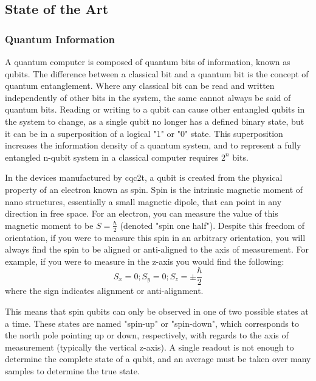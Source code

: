 \label{sec::theory}
\subsection{State of the Art}
\subsubsection{Quantum Information}
	A quantum computer is composed of quantum bits of information, known as qubits. The difference between a classical bit and a quantum bit is the concept of quantum entanglement. Where any classical bit can be read and written independently of other bits in the system, the same cannot always be said of quantum bits. Reading or writing to a qubit can cause other entangled qubits in the system to change, as a single qubit no longer has a defined binary state, but it can be in a superposition of a logical "1" or "0" state. This superposition increases the information density of a quantum system, and to represent a fully entangled n-qubit system in a classical computer requires $2^n$ bits. \cite{bennett2000quantum}
	
	In the devices manufactured by \gls{cqc2t}, a qubit is created from the physical property of an electron known as spin. Spin is the intrinsic magnetic moment of nano structures, essentially a small magnetic dipole, that can point in any direction in free space. For an electron, you can measure the value of this magnetic moment to be $S = \frac{\hbar}{2}$ (denoted "spin one half"). Despite this freedom of orientation, if you were to measure this spin in an arbitrary orientation, you will always find the spin to be aligned or anti-aligned to the axis of measurement. For example, if you were to measure in the z-axis you would find the following:
	$$S_x = 0; S_y = 0; S_z = \pm\frac{\hbar}{2}$$
	\noindent where the sign indicates alignment or anti-alignment.
	
	This means that spin qubits can only be observed in one of two possible states at a time. These states are named "spin-up" or "spin-down", which corresponds to the north pole pointing up or down, respectively, with regards to the axis of measurement (typically the vertical z-axis). A single readout is not enough to determine the complete state of a qubit, and an average must be taken over many samples to determine the true state. \\
	

